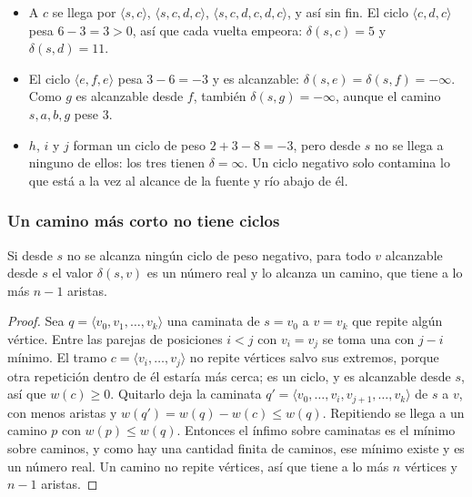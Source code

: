 \documentclass[11pt,letterpaper]{article}
\begin{document}
\begin{ejemplo}
\begin{itemize}[itemsep=0.1em]
    \item A $c$ se llega por $\langle s, c\rangle$,
          $\langle s, c, d, c\rangle$,
          $\langle s, c, d, c, d, c\rangle$, y así sin fin. El ciclo
          $\langle c, d, c\rangle$ pesa $6 - 3 = 3 > 0$, así que cada
          vuelta empeora: $\delta(s, c) = 5$ y $\delta(s, d) = 11$.
    \item El ciclo $\langle e, f, e\rangle$ pesa $3 - 6 = -3$ y es
          alcanzable: $\delta(s, e) = \delta(s, f) = -\infty$. Como
          $g$ es alcanzable desde $f$, también
          $\delta(s, g) = -\infty$, aunque el camino $s, a, b, g$ pese
          $3$.
    \item $h$, $i$ y $j$ forman un ciclo de peso $2 + 3 - 8 = -3$,
          pero desde $s$ no se llega a ninguno de ellos: los tres
          tienen $\delta = \infty$. Un ciclo negativo solo contamina
          lo que está a la vez al alcance de la fuente y río abajo de
          él.
  \end{itemize}
\end{ejemplo}

\subsubsection*{Un camino más corto no tiene ciclos}

\begin{proposicion}\label{prop:caminos-simples-fuente}
  Si desde $s$ no se alcanza ningún ciclo de peso negativo, para todo
  $v$ alcanzable desde $s$ el valor $\delta(s, v)$ es un número real
  y lo alcanza un camino, que tiene a lo más $n - 1$ aristas.
\end{proposicion}

\begin{proof}
  Sea $q = \langle v_0, v_1, \dots, v_k\rangle$ una caminata de
  $s = v_0$ a $v = v_k$ que repite algún vértice. Entre las parejas de
  posiciones $i < j$ con $v_i = v_j$ se toma una con $j - i$ mínimo.
  El tramo $c = \langle v_i, \dots, v_j\rangle$ no repite vértices
  salvo sus extremos, porque otra repetición dentro de él estaría más
  cerca; es un ciclo, y es alcanzable desde $s$, así que
  $w(c) \ge 0$. Quitarlo deja la caminata
  $q' = \langle v_0, \dots, v_i, v_{j+1}, \dots, v_k\rangle$ de $s$ a
  $v$, con menos aristas y $w(q') = w(q) - w(c) \le w(q)$. Repitiendo
  se llega a un camino $p$ con $w(p) \le w(q)$. Entonces el ínfimo
  sobre caminatas es el mínimo sobre caminos, y como hay una cantidad
  finita de caminos, ese mínimo existe y es un número real. Un camino
  no repite vértices, así que tiene a lo más $n$ vértices y $n - 1$
  aristas.
\end{proof}
\end{document}
